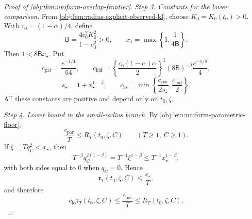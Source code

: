 \begin{proof}[Proof of \cref{obj:thm:uniform-overlap-frontier}]
\emph{Step 3. Constants for the lower comparison.}
From \cref{obj:lem:radius-explicit-observed-kl}, choose
\(K_0=K_0(t_0)>0\).  With \(c_0=(1-\alpha)/4\), define
\[
\mathsf B=\frac{4c_0^2K_0^2}{1-c_0^2}>0,
\qquad
x_\star=\max\left\{1,\frac1{4\mathsf B}\right\}.
\]
Then \(1<8\mathsf Bx_\star\).  Put
\[
c_{\mathrm{par}}=\frac{e^{-1/4}}{64},
\qquad
c_{\mathrm{hid}}
=
\left\{\frac{c_0(1-\alpha)\alpha}{2}\right\}^2
(8\mathsf B)^{-\beta}\frac{e^{-1/8}}4,
\]
\[
s_\star=1+x_\star^{1-\beta},
\qquad
c_{\mathrm{lo}}
=
\min\left\{\frac{c_{\mathrm{par}}}{2s_\star},
\frac{c_{\mathrm{hid}}}{2}\right\}.
\]
All these constants are positive and depend only on \(t_0,\zeta\). %

\emph{Step 4. Lower bound in the small-radius branch.}
By \cref{obj:lem:uniform-parametric-floor},
\[
\frac{c_{\mathrm{par}}}{T}\le R_T(t_0,\zeta,C)
\qquad (T\ge1,\ C\ge1).
\]
If \(\xi=Tq_C^2<x_\star\), then
\[
T^{-\beta}q_C^{2(1-\beta)}
=
T^{-1}\xi^{1-\beta}
\le
T^{-1}x_\star^{1-\beta},
\]
with both sides equal to \(0\) when \(q_C=0\). Hence
\[
\mathfrak r_T(t_0,\zeta,C)
\le
\frac{s_\star}{T},
\]
and therefore
\[
c_{\mathrm{lo}}\mathfrak r_T(t_0,\zeta,C)
\le
\frac{c_{\mathrm{par}}}{T}
\le
R_T(t_0,\zeta,C).
\] %


\end{proof}
